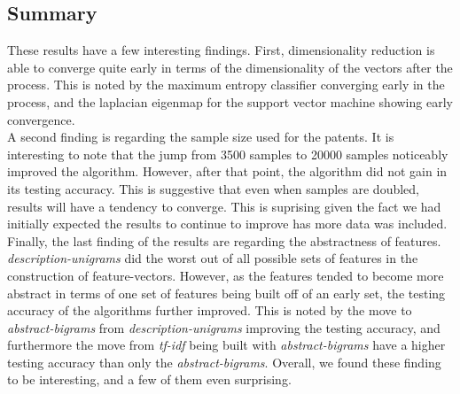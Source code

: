 \subsection{Summary}

These results have a few interesting findings.  First, dimensionality reduction is able to converge quite early in terms of the dimensionality of the vectors after the process.  This is noted by the maximum entropy classifier converging early in the process, and the laplacian eigenmap for the support vector machine showing early convergence.  
\\A second finding is regarding the sample size used for the patents.  It is interesting to note that the jump from 3500 samples to 20000 samples noticeably improved the algorithm.  However, after that point, the algorithm did not gain in its testing accuracy.  This is suggestive that even when samples are doubled, results will have a tendency to converge.  This is suprising given the fact we had initially expected the results to continue to improve has more data was included.
\\Finally, the last finding of the results are regarding the abstractness of features.  \emph{description-unigrams} did the worst out of all possible sets of features in the construction of feature-vectors.  However, as the features tended to become more abstract in terms of one set of features being built off of an early set, the testing accuracy of the algorithms further improved.  This is noted by the move to \emph{abstract-bigrams} from \emph{description-unigrams} improving the testing accuracy, and furthermore the move from \emph{tf-idf} being built with \emph{abstract-bigrams} have a higher testing accuracy than only the \emph{abstract-bigrams}. Overall, we found these finding to be interesting, and a few of them even surprising.